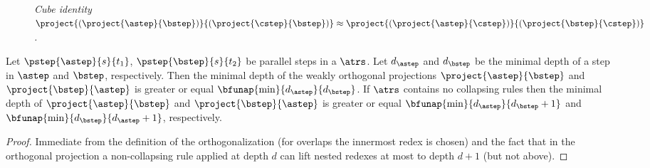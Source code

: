 \begin{remark}
\begin{figure}[hpt!]
\begin{center}
\end{center}\vspace{-3ex}
\caption{\textit{Cube identity 
   $\project{(\project{\astep}{\bstep})}{(\project{\cstep}{\bstep})} \approx
    \project{(\project{\astep}{\cstep})}{(\project{\bstep}{\cstep})}$.}}
\label{fig:cube}
\end{figure}
\end{remark}

\begin{lemma}\label{lem:proj:lift}
  Let $\pstep{\astep}{s}{t_1}$, $\pstep{\bstep}{s}{t_2}$ be parallel steps in a \woTRS{} $\atrs$.
  Let $d_\astep$ and $d_\bstep$ be the minimal depth of a step in $\astep$ and $\bstep$, respectively.
  Then the minimal depth of the weakly orthogonal projections
  $\project{\astep}{\bstep}$ and $\project{\bstep}{\astep}$
  is greater or equal $\bfunap{\min}{d_\astep}{d_\bstep}$.
  If $\atrs$ contains no collapsing rules
  then the minimal depth of $\project{\astep}{\bstep}$ and $\project{\bstep}{\astep}$ is greater or equal $\bfunap{\min}{d_\astep}{d_\bstep+1}$
  and $\bfunap{\min}{d_\bstep}{d_\astep+1}$, respectively.
\end{lemma}

\begin{proof}
  Immediate from the definition of the orthogonalization (for overlaps the innermost redex is chosen)
  and the fact that in the orthogonal projection
  a non-collapsing rule applied at depth $d$
  can lift nested redexes at most to depth $d+1$ (but not above).
\end{proof}

